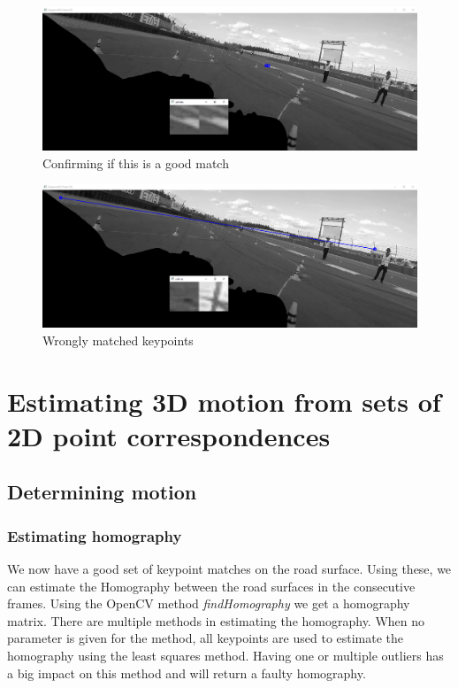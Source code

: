 \begin{figure}
    \centering
    \includegraphics[width=\textwidth]{figures/match_checking.png}
    \caption{Confirming if this is a good match}
    \label{fig:match_check}
\end{figure}
\begin{figure}
    \centering
    \includegraphics[width=\textwidth]{figures/match_checking_bad.png}
    \caption{Wrongly matched keypoints}
    \label{fig:bad_match}
\end{figure}

\section{Estimating 3D motion from sets of 2D point correspondences}
\subsection{Determining motion}
\subsubsection{Estimating homography}
We now have a good set of keypoint matches on the road surface. Using these, we can estimate the Homography between the road surfaces in the consecutive frames. Using the OpenCV method \textit{findHomography} we get a homography matrix. There are multiple methods in estimating the homography. When no parameter is given for the method, all keypoints are used to estimate the homography using the least squares method. Having one or multiple outliers has a big impact on this method and will return a faulty homography. \bigskip

